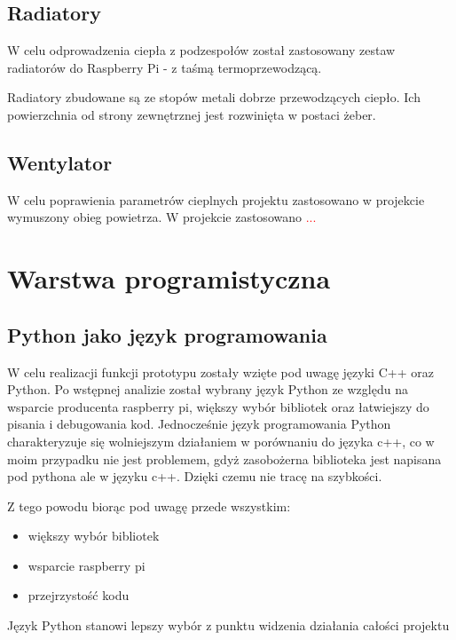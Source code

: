\documentclass[a4paper,12pt,reqno]{article}
\begin{document}
\subsection{Radiatory}

W celu odprowadzenia ciepła z podzespołów został zastosowany zestaw radiatorów do Raspberry Pi - z taśmą termoprzewodzącą.

Radiatory zbudowane są ze stopów metali dobrze przewodzących ciepło. Ich powierzchnia od strony zewnętrznej jest rozwinięta w postaci żeber.

\subsection{Wentylator}

W celu poprawienia parametrów cieplnych projektu zastosowano w projekcie wymuszony obieg powietrza. W projekcie zastosowano \textcolor{red}{...}

\newpage
\section{Warstwa programistyczna} \label{section:warstwa_programistyczna}
\subsection{Python jako język programowania}
W celu realizacji funkcji prototypu zostały wzięte pod uwagę języki C++ oraz Python. Po wstępnej analizie został wybrany język Python ze względu na \textcolor{new}{wsparcie producenta raspberry pi, większy wybór bibliotek oraz łatwiejszy do pisania i debugowania kod}. Jednocześnie język programowania Python charakteryzuje się \textcolor{new}{wolniejszym działaniem w porównaniu do języka c++, co w moim przypadku nie jest problemem, gdyż zasobożerna biblioteka jest napisana pod pythona ale w języku c++. Dzięki czemu nie tracę na szybkości}.

Z tego powodu biorąc pod uwagę przede wszystkim:
\textcolor{new}{
\begin{itemize}
\item większy wybór bibliotek
\item wsparcie raspberry pi
\item przejrzystość kodu
\end{itemize}
}
Język Python stanowi lepszy wybór z punktu widzenia działania całości projektu
\end{document}
